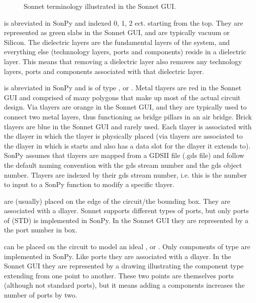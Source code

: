 \documentclass[letterpaper,10pt,english,openany]{sphinxmanual}
\begin{document}
\begin{figure}[htbp]
\centering
\capstart

\noindent{}
\caption{Sonnet terminology illustrated in the Sonnet GUI.}\label{\detokenize{source/users_guide:id2}}\end{figure}

 is abreviated  in SonPy and indexed 0, 1, 2 ect. starting from the top. They are represented as green slabs in the Sonnet GUI, and are typically vacuum or Silicon. The dielectric layers are the fundamental layers of the system, and everything else (technnology layers, ports and components) reside in a dielectric layer. This means that removing a dielectric layer also removes any technology layers, ports and components associated with that dielectric layer.

 is abreviated  in SonPy and is of type ,  or . Metal tlayers are red in the Sonnet GUI and comprised of many polygons that make up most of the actual circuit design. Via tlayers are orange in the Sonnet GUI, and they are typically used to connect two metal layers, thus functioning as bridge pillars in an air bridge. Brick tlayers are blue in the Sonnet GUI and rarely used. Each tlayer is associated with the dlayer in which the tlayer is physically placed (via tlayers are associated to the dlayer in which is starts and also has a data slot for the dlayer it extends to). SonPy assumes that tlayers are mapped from a GDSII file (.gds file) and follow the default naming convention  with  the gds stream number and  the gds object number. Tlayers are indexed by their gds stream number, i.e. this is the number to input to a SonPy function to modify a specific tlayer.

 are (usually) placed on the edge of the circuit/the bounding box. They are associated with a dlayer. Sonnet supports different types of ports, but only ports of  (STD) is implemented in SonPy. In the Sonnet GUI they are represented by a the port number in box.

 can be placed on the circuit to model an ideal ,  or . Only components of type  are implemented in SonPy. Like ports they are associated with a dlayer. In the Sonnet GUI they are represented by a drawing illustrating the component type extending from one point to another. These two points are themselves ports (although not standard ports), but it means adding a components increases the number of ports by two.
\end{document}
